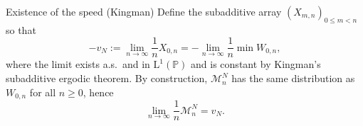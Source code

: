 \begin{block}{Existence of the speed (Kingman)}
Define the subadditive array $(X_{m,n})_{0\le m<n}$ so that
\[
    -v_N
    :=
    \lim_{n\to\infty}\frac{1}{n}X_{0,n}
    =
    -\lim_{n\to\infty}\frac{1}{n}\min W_{0,n},
\]
where the limit exists a.s.\ and in $\mathrm L^1(\mathbb P)$ and is constant by Kingman's subadditive ergodic theorem.
By construction, $\mathcal M^N_n$ has the same distribution as $W_{0,n}$ for all $n\ge 0$, hence
\[
    \lim_{n\to\infty}\frac{1}{n}\mathcal M^N_n=v_N.
\]
\end{block}

